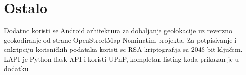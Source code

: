 %
%
\section{Ostalo}
Dodatno koristi se Android arhitektura za dobaljanje geolokacije\cite{geoa} uz reverzno geokodiranje od strane OpenStreetMap Nominatim projekta\cite{nominatim}. Za potpisivanje i enkripciju korisničkih podataka koristi se RSA\cite{rivest1978method} kriptografija sa 2048 bit ključem. LAPI je Python flask API i koristi UPnP, kompletan listing koda prikazan je u dodatku.\cite{knuth1984literate}
